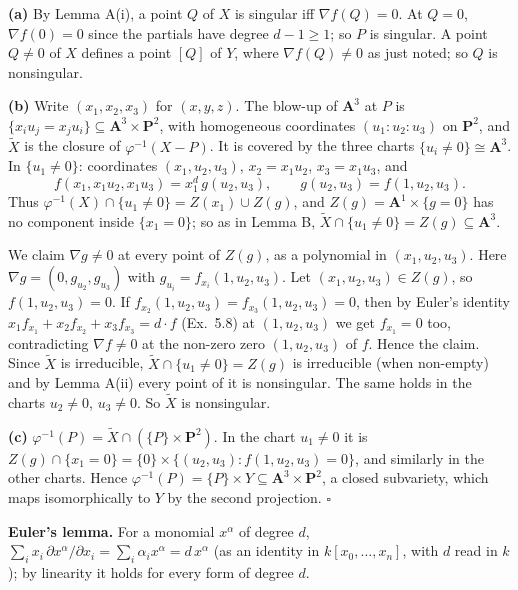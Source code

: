 \documentclass[11pt]{article}
\begin{document}
\textbf{(a)} By Lemma A(i), a point $Q$ of $X$ is singular iff $\nabla f(Q)=0$. At $Q=0$, $\nabla f(0)=0$ since the partials have degree $d-1\ge1$; so $P$ is singular. A point $Q\ne0$ of $X$ defines a point $[Q]$ of $Y$, where $\nabla f(Q)\ne0$ as just noted; so $Q$ is nonsingular.

\textbf{(b)} Write $(x_1,x_2,x_3)$ for $(x,y,z)$. The blow-up of $\mathbf A^3$ at $P$ is $\{x_iu_j=x_ju_i\}\subseteq\mathbf A^3\times\mathbf P^2$, with homogeneous coordinates $(u_1:u_2:u_3)$ on $\mathbf P^2$, and $\widetilde X$ is the closure of $\varphi^{-1}(X-P)$. It is covered by the three charts $\{u_i\ne0\}\cong\mathbf A^3$. In $\{u_1\ne0\}$: coordinates $(x_1,u_2,u_3)$, $x_2=x_1u_2$, $x_3=x_1u_3$, and
\[
f(x_1,x_1u_2,x_1u_3)=x_1^d\,g(u_2,u_3),\qquad g(u_2,u_3)=f(1,u_2,u_3).
\]
Thus $\varphi^{-1}(X)\cap\{u_1\ne0\}=Z(x_1)\cup Z(g)$, and $Z(g)=\mathbf A^1\times\{g=0\}$ has no component inside $\{x_1=0\}$; so as in Lemma B, $\widetilde X\cap\{u_1\ne0\}=Z(g)\subseteq\mathbf A^3$.

We claim $\nabla g\neq0$ at every point of $Z(g)$, as a polynomial in $(x_1,u_2,u_3)$. Here $\nabla g=(0,g_{u_2},g_{u_3})$ with $g_{u_i}=f_{x_i}(1,u_2,u_3)$. Let $(x_1,u_2,u_3)\in Z(g)$, so $f(1,u_2,u_3)=0$. If $f_{x_2}(1,u_2,u_3)=f_{x_3}(1,u_2,u_3)=0$, then by Euler's identity $x_1f_{x_1}+x_2f_{x_2}+x_3f_{x_3}=d\cdot f$ (Ex.~5.8) at $(1,u_2,u_3)$ we get $f_{x_1}=0$ too, contradicting $\nabla f\neq0$ at the non-zero zero $(1,u_2,u_3)$ of $f$. Hence the claim. Since $\widetilde X$ is irreducible, $\widetilde X\cap\{u_1\ne0\}=Z(g)$ is irreducible (when non-empty) and by Lemma A(ii) every point of it is nonsingular. The same holds in the charts $u_2\ne0$, $u_3\ne0$. So $\widetilde X$ is nonsingular.

\textbf{(c)} $\varphi^{-1}(P)=\widetilde X\cap(\{P\}\times\mathbf P^2)$. In the chart $u_1\ne0$ it is $Z(g)\cap\{x_1=0\}=\{0\}\times\{(u_2,u_3):f(1,u_2,u_3)=0\}$, and similarly in the other charts. Hence $\varphi^{-1}(P)=\{P\}\times Y\subseteq\mathbf A^3\times\mathbf P^2$, a closed subvariety, which maps isomorphically to $Y$ by the second projection. \hfill$\square$

\pf
\textbf{Euler's lemma.} For a monomial $x^\alpha$ of degree $d$, $\sum_ix_i\,\partial x^\alpha/\partial x_i=\sum_i\alpha_ix^\alpha=d\,x^\alpha$ (as an identity in $k[x_0,\ldots,x_n]$, with $d$ read in $k$); by linearity it holds for every form of degree $d$.
\end{document}
